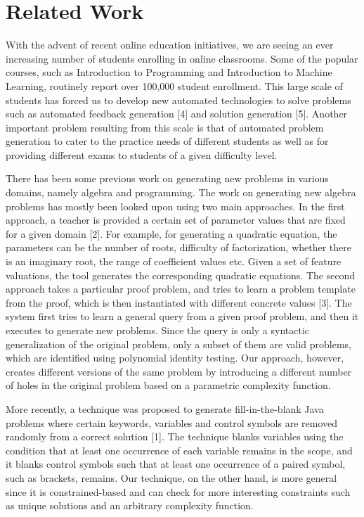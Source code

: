 \section{Related Work}

With the advent of recent online education initiatives, we are seeing an ever increasing number of students enrolling in online classrooms. Some of the popular courses, such as Introduction to Programming and Introduction to Machine Learning, routinely report over 100,000 student enrollment. This large scale of students has forced us to develop new automated technologies to solve problems such as automated feedback generation [4] and solution generation [5]. Another important problem resulting from this scale is that of automated problem generation to cater to the practice needs of different students as well as for providing different exams to students of a given difficulty level.

There has been some previous work on generating new problems in various domains, namely algebra and programming. The work on generating new algebra problems has mostly been looked upon using two main approaches. In the first approach, a teacher is provided a certain set of parameter values that are fixed for a given domain [2]. For example, for generating a quadratic equation, the parameters can be the number of roots, difficulty of factorization, whether there is an imaginary root, the range of coefficient values etc. Given a set of feature valuations, the tool generates the corresponding quadratic equations. The second approach takes a particular proof problem, and tries to learn a problem template from the proof, which is then instantiated with different concrete values [3]. The system first tries to learn a general query from a given proof problem, and then it executes to generate new problems. Since the query is only a syntactic generalization of the original problem, only a subset of them are valid problems, which are identified using polynomial identity testing. Our approach, however, creates different versions of the same problem by introducing a different number of holes in the original problem based on a parametric complexity function.

More recently, a technique was proposed to generate fill-in-the-blank Java problems where certain keywords, variables and control symbols are removed randomly from a correct solution [1]. The technique blanks variables using the condition that at least one occurrence of each variable remains in the scope, and it blanks control symbols such that at least one occurrence of a paired symbol, such as brackets, remains. Our technique, on the other hand, is more general since it is constrained-based and can check for more interesting constraints such as unique solutions and an arbitrary complexity function.

